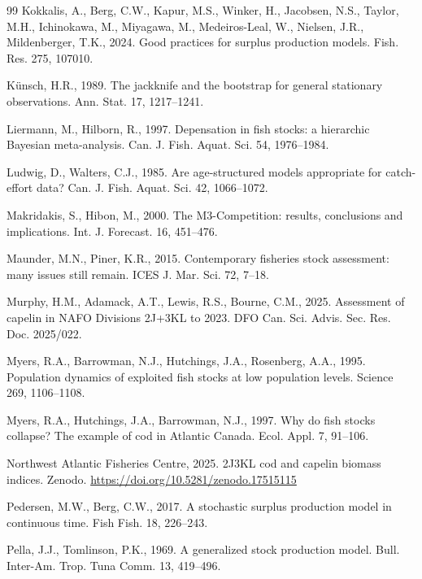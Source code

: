 \documentclass[preprint,11pt,authoryear]{elsarticle}
\theoremstyle{definition}
\theoremstyle{remark}
\begin{document}
\begin{thebibliography}{99}
Kokkalis, A., Berg, C.W., Kapur, M.S., Winker, H., Jacobsen, N.S., Taylor, M.H., Ichinokawa, M., Miyagawa, M., Medeiros-Leal, W., Nielsen, J.R., Mildenberger, T.K., 2024. Good practices for surplus production models. Fish. Res. 275, 107010.

K{\"u}nsch, H.R., 1989. The jackknife and the bootstrap for general stationary observations. Ann. Stat. 17, 1217--1241.

Liermann, M., Hilborn, R., 1997. Depensation in fish stocks: a hierarchic Bayesian meta-analysis. Can. J. Fish. Aquat. Sci. 54, 1976--1984.

Ludwig, D., Walters, C.J., 1985. Are age-structured models appropriate for catch-effort data? Can. J. Fish. Aquat. Sci. 42, 1066--1072.

Makridakis, S., Hibon, M., 2000. The M3-Competition: results, conclusions and implications. Int. J. Forecast. 16, 451--476.

Maunder, M.N., Piner, K.R., 2015. Contemporary fisheries stock assessment: many issues still remain. ICES J. Mar. Sci. 72, 7--18.

Murphy, H.M., Adamack, A.T., Lewis, R.S., Bourne, C.M., 2025. Assessment of capelin in NAFO Divisions 2J+3KL to 2023. DFO Can. Sci. Advis. Sec. Res. Doc. 2025/022.

Myers, R.A., Barrowman, N.J., Hutchings, J.A., Rosenberg, A.A., 1995. Population dynamics of exploited fish stocks at low population levels. Science 269, 1106--1108.

Myers, R.A., Hutchings, J.A., Barrowman, N.J., 1997. Why do fish stocks collapse? The example of cod in Atlantic Canada. Ecol. Appl. 7, 91--106.

Northwest Atlantic Fisheries Centre, 2025. 2J3KL cod and capelin biomass indices. Zenodo. \url{https://doi.org/10.5281/zenodo.17515115}

Pedersen, M.W., Berg, C.W., 2017. A stochastic surplus production model in continuous time. Fish Fish. 18, 226--243.

Pella, J.J., Tomlinson, P.K., 1969. A generalized stock production model. Bull. Inter-Am. Trop. Tuna Comm. 13, 419--496.


\end{thebibliography}
\end{document}
